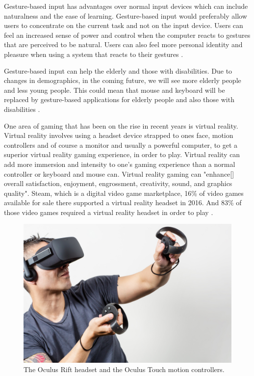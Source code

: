 \documentclass{article}
\begin{document}
Gesture-based input has advantages over normal input devices which can include naturalness and the ease of learning. Gesture-based input would preferably allow users to concentrate on the current task and not on the input device. Users can feel an increased sense of power and control when the computer reacts to gestures that are perceived to be natural. Users can also feel more personal identity and pleasure when using a system that reacts to their gestures \cite{10.1007/978-3-642-34182-3_4}.

Gesture-based input can help the elderly and those with disabilities. Due to changes in demographics, in the coming future, we will see more elderly people and less young people. This could mean that mouse and keyboard will be replaced by gesture-based applications for elderly people and also those with disabilities \cite{bhuiyan2009gesture}.

One area of gaming that has been on the rise in recent years is virtual reality. Virtual reality involves using a headset device strapped to ones face, motion controllers and of course a monitor and usually a powerful computer, to get a superior virtual reality gaming experience, in order to play. Virtual reality can add more immersion and intensity to one's gaming experience than a normal controller or keyboard and mouse can. Virtual reality gaming can "enhance[] overall satisfaction, enjoyment, engrossment, creativity, sound, and graphics quality". Steam, which is a digital video game marketplace, 16\% of video games available for sale there supported a virtual reality headset in 2016. And 83\% of those video games required a virtual reality headset in order to play \cite{shelstad2017gaming}.

\begin{figure}[H]
	\centering
	\includegraphics[width=0.72\linewidth]{images/oculus-touch.jpg}
	\caption{The Oculus Rift headset and the Oculus Touch motion controllers.}
	\label{fig:The Oculus Rift headset and the Oculus Touch motion controllers.}
\end{figure}
\end{document}
